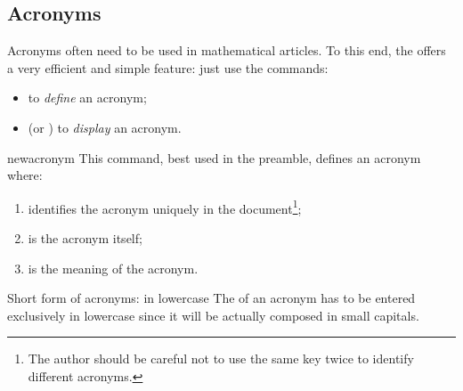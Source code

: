 \documentclass[english,nolocaltoc]{nwejmart}
\newtheorem[style=definition]{fact}
\newtheorem[title=experience]{experience}
\newtheorem[title-plural=rings]{ring}
\newtheorem[title=ideal,title-plural=ideals]{ideal}
\begin{document}
%

\subsection{Acronyms}
\label{sec:acronymes}

Acronyms often need to be used in mathematical articles. To this end,
the   offers a very efficient and simple feature:
just use the commands:
\begin{itemize}
\item {} to \emph{define} an acronym;
\item {} (or ) to \emph{display} an acronym.
\end{itemize}

\begin{docCommand}{newacronym}{}
  This command, best used in the preamble,  defines an acronym where:
  \begin{enumerate}
  \item {} identifies the acronym uniquely in the 
    document\footnote{The author should be careful not to use the same
      key twice  to identify different acronyms.};
  \item {} is  the acronym itself;
  \item {} is the meaning of the acronym.
  \end{enumerate}
\begin{dbwarning}{Short form of acronyms: in lowercase}{}
  The  of an acronym has to be entered exclusively
  in lowercase since it will be actually composed in small capitals.
\end{dbwarning}
\end{docCommand}
\end{document}
